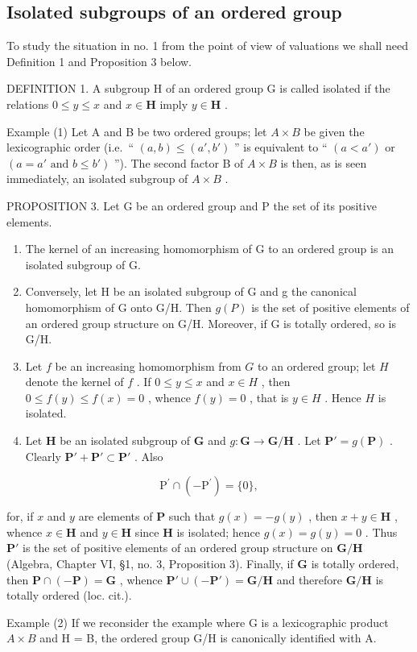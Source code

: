 \subsection{Isolated subgroups of an ordered group}

To study the situation in no. 1 from the point of view of valuations we shall need Definition 1 and Proposition 3 below.

DEFINITION 1. A subgroup H of an ordered group G is called isolated if the relations \(0 \leqslant y \leqslant x\) and \(x \in \mathbf{H}\) imply \(y \in \mathbf{H}\) .

Example (1) Let A and B be two ordered groups; let \(A \times B\) be given the lexicographic order (i.e.~`` \((a, b) \leqslant (a', b')\) '' is equivalent to `` \((a < a')\) or \((a = a' \text{ and } b \leqslant b')\) ''). The second factor B of \(A \times B\) is then, as is seen immediately, an isolated subgroup of \(A \times B\) .

PROPOSITION 3. Let G be an ordered group and P the set of its positive elements.

\begin{enumerate}
\def\labelenumi{(\alph{enumi})}
\item
  The kernel of an increasing homomorphism of G to an ordered group is an isolated subgroup of G.
\item
  Conversely, let H be an isolated subgroup of G and g the canonical homomorphism of G onto G/H. Then \(g(P)\) is the set of positive elements of an ordered group structure on G/H. Moreover, if G is totally ordered, so is G/H.
\item
  Let \(f\) be an increasing homomorphism from \(G\) to an ordered group; let \(H\) denote the kernel of \(f\) . If \(0 \leqslant y \leqslant x\) and \(x \in H\) , then \(0 \leqslant f(y) \leqslant f(x) = 0\) , whence \(f(y) = 0\) , that is \(y \in H\) . Hence \(H\) is isolated.
\item
  Let \(\mathbf{H}\) be an isolated subgroup of \(\mathbf{G}\) and \(g\colon \mathbf{G}\to \mathbf{G} / \mathbf{H}\) . Let \(\mathbf{P}' = g(\mathbf{P})\) . Clearly \(\mathbf{P}' + \mathbf{P}'\subset \mathbf{P}'\) . Also
\end{enumerate}

\[
\mathrm{P} ^ {\prime} \cap (- \mathrm{P} ^ {\prime}) = \{0 \},
\]

for, if \(x\) and \(y\) are elements of \(\mathbf{P}\) such that \(g(x) = -g(y)\) , then \(x + y \in \mathbf{H}\) , whence \(x \in \mathbf{H}\) and \(y \in \mathbf{H}\) since \(\mathbf{H}\) is isolated; hence \(g(x) = g(y) = 0\) . Thus \(\mathbf{P}'\) is the set of positive elements of an ordered group structure on \(\mathbf{G} / \mathbf{H}\) (Algebra, Chapter VI, §1, no. 3, Proposition 3). Finally, if \(\mathbf{G}\) is totally ordered, then \(\mathbf{P} \cap (-\mathbf{P}) = \mathbf{G}\) , whence \(\mathbf{P}' \cup (-\mathbf{P}') = \mathbf{G} / \mathbf{H}\) and therefore \(\mathbf{G} / \mathbf{H}\) is totally ordered (loc. cit.).

Example (2) If we reconsider the example where G is a lexicographic product \(A \times B\) and H = B, the ordered group G/H is canonically identified with A.

